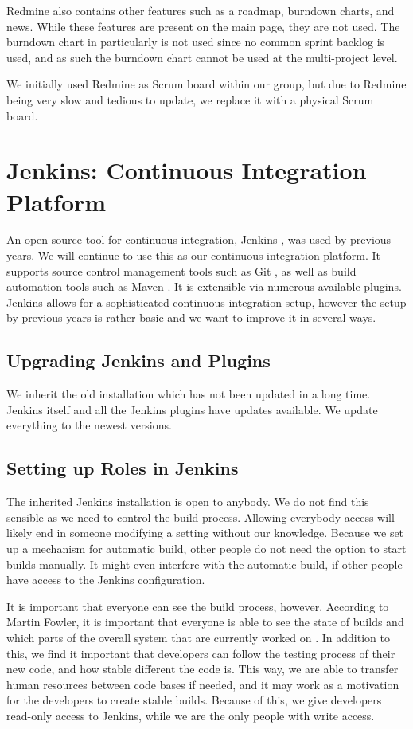 Redmine also contains other features such as a roadmap, burndown charts, and news. While these features are present on the main page, they are not used. The burndown chart in particularly is not used since no common sprint backlog is used, and as such the burndown chart cannot be used at the multi-project level.

We initially used Redmine as Scrum board within our group, but due to Redmine being very slow and tedious to update, we replace it with a physical Scrum board.

\section{Jenkins: Continuous Integration Platform}\label{sec:jenkins}
An open source tool for continuous integration, Jenkins \parencite{JenkinsWebsite}, was used by previous years. We will continue to use this as our continuous integration platform. It supports source control management tools such as Git \parencite{gitwebsite}, as well as build automation tools such as Maven \parencite{mavenwebsite}. It is extensible via numerous available plugins. Jenkins allows for a sophisticated continuous integration setup, however the setup by previous years is rather basic and we want to improve it in several ways.

\subsection{Upgrading Jenkins and Plugins}
We inherit the old installation which has not been updated in a long time. Jenkins itself and all the Jenkins plugins have updates available. We update everything to the newest versions.

\subsection{Setting up Roles in Jenkins}
The inherited Jenkins installation is open to anybody. We do not find this sensible as we need to control the build process. Allowing everybody access will likely end in someone modifying a setting without our knowledge. Because we set up a mechanism for automatic build, other people do not need the option to start builds manually. It might even interfere with the automatic build, if other people have access to the Jenkins configuration.

It is important that everyone can see the build process, however. According to Martin Fowler, it is important that everyone is able to see the state of builds and which parts of the overall system that are currently worked on \parencite{fowlerCI}. In addition to this, we find it important that developers can follow the testing process of their new code, and how stable different the code is. This way, we are able to transfer human resources between code bases if needed, and it may work as a motivation for the developers to create stable builds. Because of this, we give developers read-only access to Jenkins, while we are the only people with write access.

